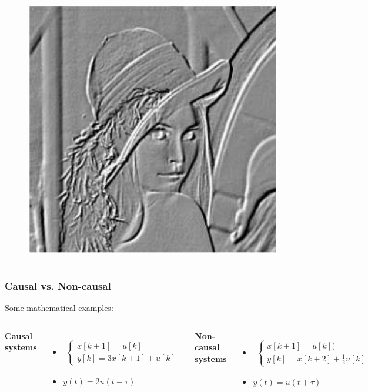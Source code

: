 \documentclass{beamer}
\begin{document}
\begin{frame}
\begin{columns}
\begin{figure}
\includegraphics[width=.5\linewidth]{highlight}
\end{figure}
\vspace{-4ex}

\end{columns}
\end{frame}


\begin{frame}
\frametitle{Causal vs. Non-causal}
\vspace{-10ex}
Some mathematical examples:\\
\bigskip
\begin{columns}
\textbf{Causal systems}\\
\begin{itemize}
\item \begin{align*}
\begin{cases}
x[k+1] = u[k]\\
y[k] = 3 x [k+1] + u[k]
\end{cases}
\end{align*}
\item $y(t) = 2 u(t-\tau)$
\end{itemize}

\textbf{Non-causal systems}\\
\begin{itemize}
\item \begin{align*}
\begin{cases}
x[k+1] = u[k])\\
y[k] = x[k+2] + \frac{1}{2}u[k]
\end{cases}
\end{align*}
\item $y(t) = u(t + \tau)$
\end{itemize}

\end{columns}
\end{frame}
\end{document}
